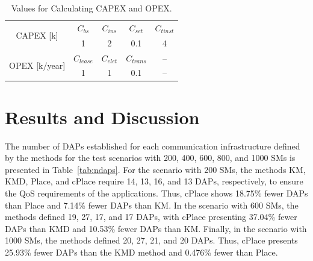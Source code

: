 \documentclass[a4paper,fleqn]{cas-dc}
\begin{document}
\begin{table}[ht]
    \centering
    \caption{Values for Calculating \gls{CAPEX} and \gls{OPEX}.}
    \label{tab:capex_opex}
    \begin{tabular}{c|cccc}
        \hline \hline
        \toprule
        \multirow{2}{*}{\gls{CAPEX} [k\EUR{}]} & $C_{bs}$ & $C_{ins}$ & $C_{set}$ & $C_{tinst}$ \\ \cline{2-5}
                                 & 1 & 2 & 0.1 & 4 \\ 
        \midrule
        \multirow{2}{*}{\gls{OPEX} [k\EUR{}$/$year]} & $C_{lease}$ & $C_{elet}$ & $C_{trans}$ & -- \\ \cline{2-5}
                                 & 1  & 1 & 0.1 & -- \\ \hline
        \bottomrule
    \end{tabular}
\end{table}

\section{Results and Discussion} \label{sec:results}

The number of \gls{DAPs} established for each communication infrastructure defined by the methods for the test scenarios with 200, 400, 600, 800, and 1000 \gls{SMs} is presented in Table~\ref{tab:ndaps}. For the scenario with 200 \gls{SMs}, the methods KM, KMD, Place, and cPlace require 14, 13, 16, and 13 \gls{DAPs}, respectively, to ensure the \gls{QoS} requirements of the applications. Thus, cPlace shows 18.75\% fewer \gls{DAPs} than Place and 7.14\% fewer \gls{DAPs} than KM. In the scenario with 600 \gls{SMs}, the methods defined 19, 27, 17, and 17 \gls{DAPs}, with cPlace presenting 37.04\% fewer \gls{DAPs} than KMD and 10.53\% fewer \gls{DAPs} than KM. Finally, in the scenario with 1000 \gls{SMs}, the methods defined 20, 27, 21, and 20 \gls{DAPs}. Thus, cPlace presents 25.93\% fewer \gls{DAPs} than the KMD method and 0.476\% fewer than Place.
\end{document}
